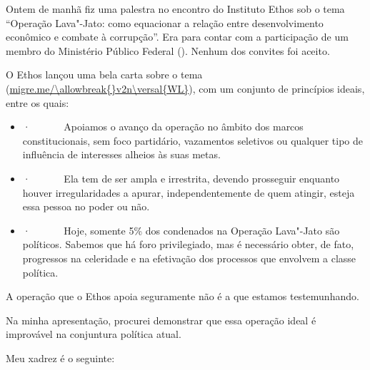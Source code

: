  

Ontem de manhã fiz uma palestra no encontro do Instituto Ethos sob o
tema ``Operação Lava"-Jato: como equacionar a relação entre
desenvolvimento econômico e combate à corrupção''. Era para contar com a
participação de um membro do Ministério Público Federal (). Nenhum
dos convites foi aceito.

O Ethos lançou uma bela carta sobre o tema
(\url{migre.me/\allowbreak{}v2n\versal{WL}}), com um conjunto de princípios ideais,
entre os quais:

\begin{itemize}
\itemsep1pt\parskip0pt
\item
  ·~~~~~~ Apoiamos o avanço da operação no âmbito dos marcos
  constitucionais, sem foco partidário, vazamentos seletivos ou qualquer
  tipo de influência de interesses alheios às suas metas.
\item
  ·~~~~~~ Ela tem de ser ampla e irrestrita, devendo prosseguir enquanto
  houver irregularidades a apurar, independentemente de quem atingir,
  esteja essa pessoa no poder ou não.
\item
  ·~~~~~~ Hoje, somente 5\% dos condenados na Operação Lava"-Jato são
  políticos. Sabemos que há foro privilegiado, mas é necessário obter,
  de fato, progressos na celeridade e na efetivação dos processos que
  envolvem a classe política.
\end{itemize}

A operação que o Ethos apoia seguramente não é a que estamos
testemunhando.

Na minha apresentação, procurei demonstrar que essa operação ideal é
improvável na conjuntura política atual.

Meu xadrez é o seguinte:


